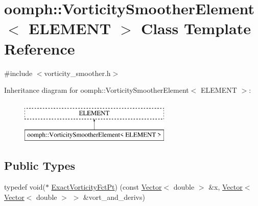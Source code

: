 \hypertarget{classoomph_1_1VorticitySmootherElement}{}\section{oomph\+:\+:Vorticity\+Smoother\+Element$<$ E\+L\+E\+M\+E\+NT $>$ Class Template Reference}
\label{classoomph_1_1VorticitySmootherElement}


{\ttfamily \#include $<$vorticity\+\_\+smoother.\+h$>$}

Inheritance diagram for oomph\+:\+:Vorticity\+Smoother\+Element$<$ E\+L\+E\+M\+E\+NT $>$\+:\begin{figure}[H]
\begin{center}
\leavevmode
\includegraphics[height=2.000000cm]{classoomph_1_1VorticitySmootherElement}
\end{center}
\end{figure}
\subsection*{Public Types}
\begin{DoxyCompactItemize}
\item 
typedef void($\ast$ \hyperlink{classoomph_1_1VorticitySmootherElement_ad4ed9d81ba7718bf747e0abdd41cdaa1}{Exact\+Vorticity\+Fct\+Pt}) (const \hyperlink{classoomph_1_1Vector}{Vector}$<$ double $>$ \&x, \hyperlink{classoomph_1_1Vector}{Vector}$<$ \hyperlink{classoomph_1_1Vector}{Vector}$<$ double $>$ $>$ \&vort\+\_\+and\+\_\+derivs)
\end{DoxyCompactItemize}

